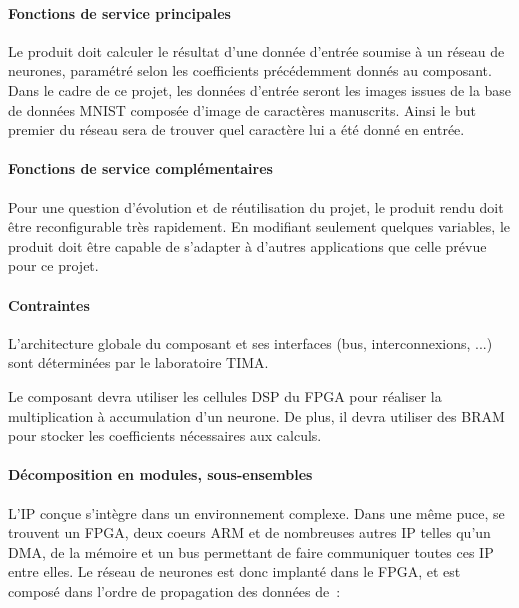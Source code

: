 \paragraph{Fonctions de service principales\\}

Le produit doit calculer le résultat d'une donnée d'entrée soumise à un réseau
de neurones, paramétré selon les coefficients précédemment donnés au composant.
Dans le cadre de ce projet, les données d'entrée seront les images issues de la base de données MNIST\cite{lecun2010mnist} composée d'image de caractères manuscrits.
Ainsi le but premier du réseau sera de trouver quel caractère lui a été donné en entrée.

\paragraph{Fonctions de service complémentaires\\}
Pour une question d'évolution et de réutilisation du projet, le produit rendu doit être reconfigurable très rapidement.
En modifiant seulement quelques variables, le produit doit être capable de s'adapter à d'autres applications que celle prévue pour ce projet.

\paragraph{Contraintes\\}

L'architecture globale du composant et ses interfaces (bus, interconnexions, ...) sont déterminées
par le laboratoire TIMA.

Le composant devra utiliser les cellules DSP du FPGA pour réaliser la multiplication à accumulation
d'un neurone. De plus, il devra utiliser des BRAM pour stocker les coefficients nécessaires aux calculs.

\paragraph{Décomposition en modules, sous-ensembles\\}

L'IP conçue s'intègre dans un environnement complexe.
Dans une même puce, se trouvent un FPGA, deux coeurs ARM et de nombreuses autres IP telles qu'un DMA,
de la mémoire et un bus permettant de faire communiquer toutes ces IP entre elles.
Le réseau de neurones est donc implanté dans le FPGA, et est composé dans l'ordre de propagation des données de~:

